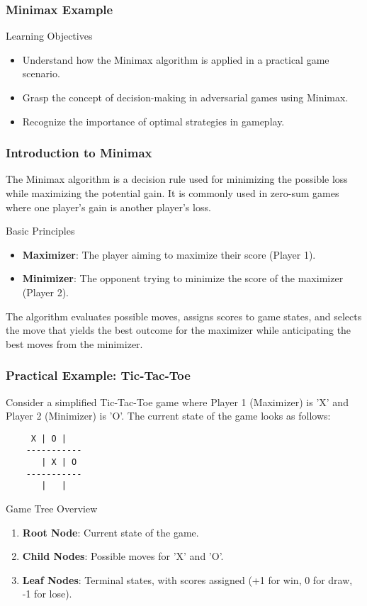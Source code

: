 \documentclass[aspectratio=169]{beamer}
\begin{document}
\begin{frame}[fragile]
    \frametitle{Minimax Example}
    \begin{block}{Learning Objectives}
        \begin{itemize}
            \item Understand how the Minimax algorithm is applied in a practical game scenario.
            \item Grasp the concept of decision-making in adversarial games using Minimax.
            \item Recognize the importance of optimal strategies in gameplay.
        \end{itemize}
    \end{block}
\end{frame}

\begin{frame}[fragile]
    \frametitle{Introduction to Minimax}
    The Minimax algorithm is a decision rule used for minimizing the possible loss while maximizing the potential gain. It is commonly used in zero-sum games where one player's gain is another player's loss.

    \begin{block}{Basic Principles}
        \begin{itemize}
            \item \textbf{Maximizer}: The player aiming to maximize their score (Player 1).
            \item \textbf{Minimizer}: The opponent trying to minimize the score of the maximizer (Player 2).
        \end{itemize}
    \end{block}

    The algorithm evaluates possible moves, assigns scores to game states, and selects the move that yields the best outcome for the maximizer while anticipating the best moves from the minimizer.
\end{frame}

\begin{frame}[fragile]
    \frametitle{Practical Example: Tic-Tac-Toe}
    Consider a simplified Tic-Tac-Toe game where Player 1 (Maximizer) is 'X' and Player 2 (Minimizer) is 'O'. The current state of the game looks as follows:

    \begin{verbatim}
     X | O |  
    -----------
       | X | O
    -----------
       |   |  
    \end{verbatim}

    \begin{block}{Game Tree Overview}
        \begin{enumerate}
            \item \textbf{Root Node}: Current state of the game.
            \item \textbf{Child Nodes}: Possible moves for 'X' and 'O'.
            \item \textbf{Leaf Nodes}: Terminal states, with scores assigned (+1 for win, 0 for draw, -1 for lose).
        \end{enumerate}
    \end{block}
\end{frame}
\end{document}

